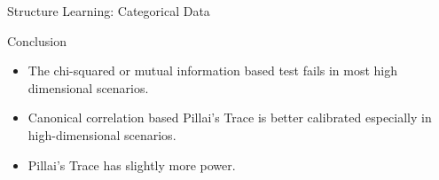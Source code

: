\documentclass{beamer}
\begin{document}
\begin{frame}{Structure Learning: Categorical Data}
\end{frame}

\begin{frame}{Conclusion}
	\begin{itemize}
		\item The chi-squared or mutual information based test fails in most high dimensional scenarios.
		\item Canonical correlation based Pillai's Trace is better calibrated especially in high-dimensional scenarios.
		\item Pillai's Trace has slightly more power.
	\end{itemize}
\end{frame}
\end{document}
